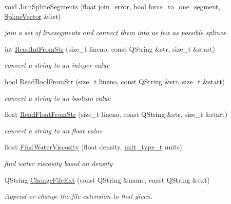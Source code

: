 \begin{DoxyCompactItemize}
void \hyperlink{namespaceShipCAD_a2eddf75f0e29363ab81a3fb0e0211848}{Join\-Spline\-Segments} (float join\-\_\-error, bool force\-\_\-to\-\_\-one\-\_\-segment, \hyperlink{namespaceShipCAD_a053b941b2c87049bb9380428d4d5a056}{Spline\-Vector} \&list)
\begin{DoxyCompactList}\small\item\em join a set of linesegments and connect them into as few as possible splines \end{DoxyCompactList}\item 
int \hyperlink{namespaceShipCAD_a70b238d926183460670b82d9680b5cb9}{Read\-Int\-From\-Str} (size\-\_\-t lineno, const Q\-String \&str, size\-\_\-t \&start)
\begin{DoxyCompactList}\small\item\em convert a string to an integer value \end{DoxyCompactList}\item 
bool \hyperlink{namespaceShipCAD_af343b5a2dfd09b32b9451d35e0676384}{Read\-Bool\-From\-Str} (size\-\_\-t lineno, const Q\-String \&str, size\-\_\-t \&start)
\begin{DoxyCompactList}\small\item\em convert a string to an boolean value \end{DoxyCompactList}\item 
float \hyperlink{namespaceShipCAD_a696bc38864a736dda734802f3cda4346}{Read\-Float\-From\-Str} (size\-\_\-t lineno, const Q\-String \&str, size\-\_\-t \&start)
\begin{DoxyCompactList}\small\item\em convert a string to an float value \end{DoxyCompactList}\item 
float \hyperlink{namespaceShipCAD_a44025ef38e6ee9f12cbf032660f637b5}{Find\-Water\-Viscosity} (float density, \hyperlink{namespaceShipCAD_ac6a7a28b4b063771afae92decb602da5}{unit\-\_\-type\-\_\-t} units)
\begin{DoxyCompactList}\small\item\em find water viscosity based on density \end{DoxyCompactList}\item 
Q\-String \hyperlink{namespaceShipCAD_ae416df4a72579eb3a1a418b19551eb53}{Change\-File\-Ext} (const Q\-String \&name, const Q\-String \&ext)
\begin{DoxyCompactList}\small\item\em Append or change the file extension to that given. \end{DoxyCompactList}\item 

\end{DoxyCompactItemize}
